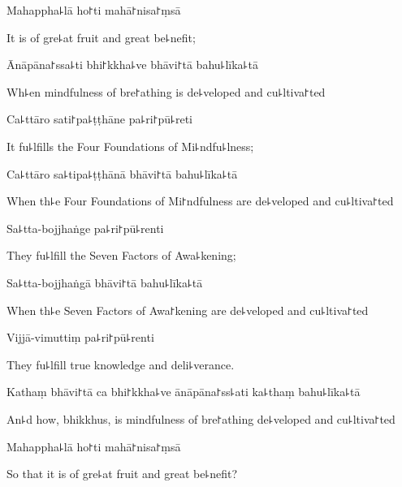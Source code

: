 Mahappha꜕lā ho꜓ti mahā꜓nisa꜓ṃsā

\begin{english}
  It is of gre꜕at fruit and great be꜕nefit;
\end{english}

Ānāpāna꜓ssa꜕ti bhi꜓kkha꜕ve bhāvi꜓tā bahu꜕līka꜕tā

\begin{english}
  Wh꜕en mindfulness of bre꜓athing is de꜕veloped and cu꜕ltiva꜓ted
\end{english}

Ca꜕ttāro sati꜓pa꜕ṭṭhāne pa꜕ri꜓pū꜕reti

\begin{english}
  It fu꜕lfills the Four Foundations of Mi꜕ndfu꜕lness;
\end{english}

Ca꜕ttāro sa꜕tipa꜕ṭṭhānā bhāvi꜓tā bahu꜕līka꜕tā

\begin{english}
  When th꜕e Four Foundations of Mi꜓ndfulness are de꜕veloped and cu꜕ltiva꜓ted
\end{english}

Sa꜕tta-bojjhaṅge pa꜕ri꜓pū꜕renti

\begin{english}
  They fu꜕lfill the Seven Factors of Awa꜕kening;
\end{english}

Sa꜕tta-bojjhaṅgā bhāvi꜓tā bahu꜕līka꜕tā

\begin{english}
  When th꜕e Seven Factors of Awa꜓kening are de꜕veloped and cu꜕ltiva꜓ted
\end{english}

Vijjā-vimuttiṃ pa꜕ri꜓pū꜕renti

\begin{english}
  They fu꜕lfill true knowledge and deli꜕verance.
\end{english}

Kathaṃ bhāvi꜓tā ca bhi꜓kkha꜕ve ānāpāna꜓ss꜕ati ka꜕thaṃ bahu꜕līka꜕tā

\begin{english}
  An꜕d how, bhikkhus, is mindfulness of bre꜓athing de꜕veloped and cu꜕ltiva꜓ted
\end{english}

Mahappha꜕lā ho꜓ti mahā꜓nisa꜓ṃsā

\begin{english}
  So that it is of gre꜕at fruit and great be꜕nefit?
\end{english}

